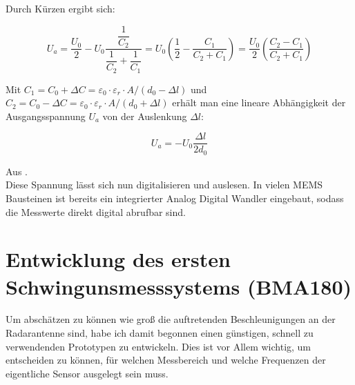 \documentclass[12pt,a4paper]{scrartcl}
\begin{document}
Durch Kürzen ergibt sich:

\begin{equation}
U_a = \frac{U_0}{2} - U_0 \dfrac{\dfrac{1}{C_2}}{\dfrac{1}{C_2} + \dfrac{1}{C_1}} = U_0 \left( \frac{1}{2} - \frac{C_1}{C_2 + C_1} \right) = \frac{U_0}{2} \left( \frac{C_2 - C_1}{C_2 + C_1} \right)
\end{equation}

Mit $C_1 = C_0 + \Delta C = \varepsilon _0 \cdot \varepsilon _r \cdot A / (d_0 - \Delta l )$ und $C_2 = C_0 - \Delta C = \varepsilon _0 \cdot \varepsilon _r \cdot A / (d_0 + \Delta l )$ erhält man eine lineare Abhängigkeit der Ausgangsspannung $U_a$ von der Auslenkung  $\Delta l$:

\begin{equation}
U_a = - U_0 \frac{\Delta l}{2 d_0}
\end{equation}

Aus \citep{:2002fk}.\\

Diese Spannung lässt sich nun digitalisieren und auslesen. In vielen MEMS Bausteinen ist bereits ein integrierter Analog Digital Wandler eingebaut, sodass die Messwerte direkt digital abrufbar sind. 

\newpage

\section{Entwicklung des ersten Schwingunsmesssystems (BMA180)}

Um abschätzen zu können wie groß die auftretenden Beschleunigungen an der Radarantenne sind, habe ich damit begonnen einen günstigen, schnell zu verwendenden Prototypen zu entwickeln. Dies ist vor Allem wichtig, um entscheiden zu können, für welchen Messbereich und welche Frequenzen der eigentliche Sensor ausgelegt sein muss. \\
\end{document}

